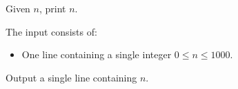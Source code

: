 \problemname{\problemyamlname}

\newcommand{\maxn}{1000}

Given $n$, print $n$.

\begin{Input}
	The input consists of:
	\begin{itemize}
		\item One line containing a single integer $0\leq n\leq \maxn$.
	\end{itemize}
\end{Input}

\begin{Output}
	Output a single line containing $n$.
\end{Output}

